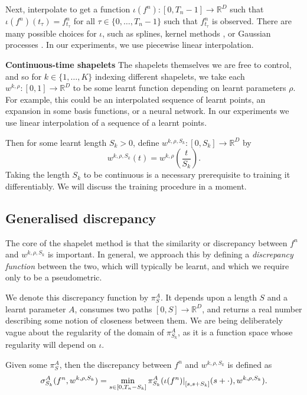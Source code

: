 \documentclass{article}
\theoremstyle{plain}
\theoremstyle{definition}
\newcommand{\reals}{\mathbb{R}}
\newcommand{\restr}[2]{{\left.\kern-\nulldelimiterspace #1 \right|_{#2}}}
\newcommand{\boldheading}[1]{

\textbf{#1}\quad}
\begin{document}
	Next, interpolate to get a function $\iota(f^n) \colon [0, T_n - 1] \to \reals^D$ such that $\iota(f^n)(t_\tau) = f^n_{t_\tau}$ for all $\tau \in \{0, \ldots, T_n - 1\}$ such that $f^n_{t_\tau}$ is observed. There are many possible choices for $\iota$, such as splines, kernel methods \cite{interpolation-prediction}, or Gaussian processes \cite{li2016scalable, futoma2017mgp}. In our experiments, we use piecewise linear interpolation.
	
	\boldheading{Continuous-time shapelets}
	The shapelets themselves we are free to control, and so for $k \in \{1, \ldots, K\}$ indexing different shapelets, we take each $w^{k, \rho} \colon [0, 1] \to \reals^D$ to be some learnt function depending on learnt parameters $\rho$. For example, this could be an interpolated sequence of learnt points, an expansion in some basis functions, or a neural network. In our experiments we use linear interpolation of a sequence of a learnt points.
	
	Then for some learnt length $S_k > 0$, define $w^{k, \rho, S_k} \colon [0, S_k] \to \reals^D$ by
	\begin{equation*}
	w^{k, \rho, S_k}(t) = w^{k, \rho}\left(\frac{t}{S_k}\right).
	\end{equation*}
	Taking the length $S_k$ to be continuous is a necessary prerequisite to training it differentiably. We will discuss the training procedure in a moment.
	
	\subsection{Generalised discrepancy}
	The core of the shapelet method is that the similarity or discrepancy between $f^n$ and $w^{k, \rho, S_k}$ is important. In general, we approach this by defining a \emph{discrepancy function} between the two, which will typically be learnt, and which we require only to be a pseudometric.
	
	We denote this discrepancy function by $\pi^A_{S}$. It depends upon a length $S$ and a learnt parameter $A$, consumes two paths $[0, S] \to \reals^D$, and returns a real number describing some notion of closeness between them. We are being deliberately vague about the regularity of the domain of $\pi^A_{S_k}$, as it is a function space whose regularity will depend on $\iota$.	
	
	Given some $\pi^A_{S}$, then the discrepancy between $f^n$ and $w^{k, \rho, S_k}$ is defined as
	\begin{equation}\label{eq:new-sigma}
	\sigma^A_{S_k}(f^n, w^{k, \rho, S_k}) = \min_{s \in [0, T_n - S_k]} \pi^A_{S_k}(\restr{\iota(f^n)}{[s, s + S_k]}(s + \cdot), w^{k, \rho, S_k}).
	\end{equation}
	
\end{document}
